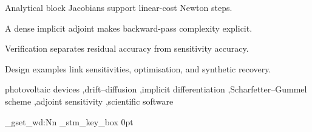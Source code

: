 \documentclass[a4paper,fleqn]{cas-sc}
\begin{document}
\title[mode=title]{\papertitle}
\author[1]{Mohammed Benaissa}
\cormark[1]
\author[1]{Mohamed Maoudj}
\author[1,2]{Abd Elouahab Noua}

\begin{highlights}
\item Analytical block Jacobians support linear-cost Newton steps.
\item A dense implicit adjoint makes backward-pass complexity explicit.
\item Verification separates residual accuracy from sensitivity accuracy.
\item Design examples link sensitivities, optimisation, and synthetic recovery.
\end{highlights}
\begin{keywords}
photovoltaic devices \sep drift--diffusion \sep implicit differentiation
\sep Scharfetter--Gummel scheme \sep adjoint sensitivity \sep scientific software
\end{keywords}
\ExplSyntaxOn
\box_gset_wd:Nn \g_stm_key_box { 0pt }
\ExplSyntaxOff
\maketitle



\end{document}
